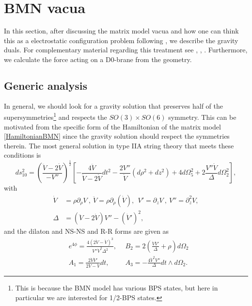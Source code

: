 \documentclass[11pt,english]{article}
\newcommand{\be}{\begin{equation}}
\newcommand{\ee}{\end{equation}}
\newcommand{\p}{\partial}
\numberwithin{equation}{section}
\begin{document}
\section{BMN vacua}\label{Vacua}
In this section, after discussing the matrix model vacua and how one can think this as a electrostatic configuration problem following \cite{Lin2006}, we describe the gravity duals.  For complementary material regarding this treatment see \cite{Lozano2017}, \cite{Lin2004a}, \cite{Costa2015}. Furthermore, we calculate the force acting on a D0-brane from the geometry.
\subsection{Generic analysis}
In general, we should look for a gravity solution that preserves half of the supersymmetries\footnote{This is because the BMN model has various BPS states, but here in particular we are interested for 1/2-BPS states.} and respects the $SO(3)\times SO(6)$ symmetry. This can be motivated from the specific form of the Hamiltonian of the matrix model \eqref{HamiltonianBMN} since the gravity solution should respect the symmetries therein.  The most general solution in type IIA string theory that meets these conditions is \cite{Lin2006}
\be \label{IIAmetric}
ds^2_{10}=\left(\frac{\ddot{V}-2\dot{V}}{-V''}\right)^\frac{1}{2}\left[-\frac{4\ddot{V}}{\ddot{V}-2\dot{V}}dt^2-\frac{2V''}{\dot{V}}\left(d\rho^2+dz^2\right)+4d\Omega_5^2+2\frac{V''\dot{V}}{\Delta}d\Omega_2^2\right],
\ee 
with
\begin{align*}
\dot{V}&=\rho\p_{\rho} V~,~\ddot{V}=\rho\p_{\rho}(\dot{V}),~
~V'=\p_{z}V~,~V''=\p^2_zV,\\
\Delta&=\left(\ddot{V}-2\dot{V}\right)V''-\left(\dot{V}'\right)^2,
\end{align*}
and the dilaton and NS-NS and R-R forms are given as 
\begin{eqnarray}
&e^{4\phi}=\frac{4(2\dot{V}-\ddot{V})^3}{V''\dot{V}^2\Delta^2},~~&B_{2}=2\left(\frac{\dot{V}\dot{V}'}{\Delta}+\rho\right)d\Omega_2\nonumber\\
&A_1=\frac{2\dot{V}\dot{V}'}{2\dot{V}-\ddot{V}}dt,~~&A_3=-\frac{4\dot{V}^2V''}{\Delta}dt\wedge d\Omega_2.
\end{eqnarray}
\end{document}
